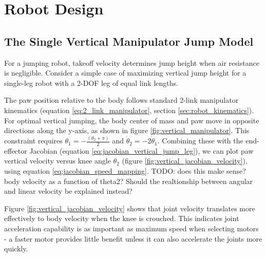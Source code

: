 \section{Robot Design}
\label{sec:robot_design}

\subsection{The Single Vertical Manipulator Jump Model}

For a jumping robot, takeoff velocity determines jump height when air resistance is negligible. Consider a simple case of maximizing vertical jump height for a single-leg robot with a 2-DOF leg of equal link lengths.

The paw position relative to the body follows standard 2-link manipulator kinematics (equation \ref{eq:2_link_manipulator}, section \ref{sec:robot_kinematics}). For optimal vertical jumping, the body center of mass and paw move in opposite directions along the y-axis, as shown in figure \ref{fig:vertical_manipulator}. This constraint requires $\theta_1 = -\frac{(\theta_2+\pi)}{2}$ and $\dot{\theta}_2=-2\dot{\theta}_1$. Combining these with the end-effector Jacobian (equation \ref{eq:jacobian_vertical_jump_leg}), we can plot paw vertical velocity versus knee angle $\theta_2$ (figure \ref{fig:vertical_jacobian_velocity}), using equation \ref{eq:jacobian_speed_mapping}. TODO: does this make sense? body velocity as a function of theta2? Should the realtionship between angular and linear velocity be explained instead?

Figure \ref{fig:vertical_jacobian_velocity} shows that joint velocity translates more effectively to body velocity when the knee is crouched. This indicates joint acceleration capability is as important as maximum speed when selecting motors - a faster motor provides little benefit unless it can also accelerate the joints more quickly.

